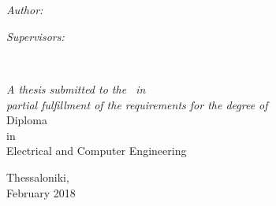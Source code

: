 \documentclass[
11pt, %
english, %
onehalfspacing, %
liststotoc, %
toctotoc, %
parskip, %
headsepline, %
consistentlayout, %
]{MastersDoctoralThesis} %
\author{Dimitrios \textsc{Geromichalos}} %
\begin{document}
\frontmatter %

\pagestyle{plain} %


\begin{titlepage}
\begin{center}

\vspace*{.02\textheight}
{\scshape\LARGE \univname\par}\vspace{4.0cm}

\HRule \\[0.4cm]
{\huge \bfseries \ttitle\par}\vspace{0.4cm}
\HRule \\[1.5cm]

\begin{minipage}[t]{0.5\textwidth}
\begin{flushleft} \large
\emph{Author:}\\ {\authorname}
\end{flushleft}
\end{minipage}
\begin{minipage}[t]{0.49\textwidth}
\begin{flushright} \large
\emph{Supervisors:} \\ {\supname}
\end{flushright}
\end{minipage}\\[3cm]

\vfill

\large \textit{
    A thesis submitted to the \facname\ in\\
    partial fulfillment of the requirements for the degree of
}\\
[1.0cm]
Diploma\\ in\\ Electrical and Computer Engineering\\
[2cm]

\vfill

{\large Thessaloniki,\\February 2018}\\[4cm]

\vfill

\end{center}
\end{titlepage}
\end{document}
